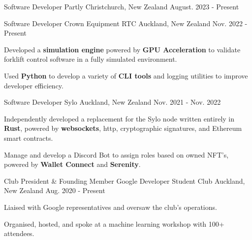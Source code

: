 
\begin{cventries}
  \cventry
    {Software Developer}
    {Partly}
    {Christchurch, New Zealand}
    {August. 2023 - Present}
    {
    }

  \cventry
    {Software Developer}
    {Crown Equipment RTC}
    {Auckland, New Zealand}
    {Nov. 2022 - Present}
    {
      \begin{cvitems}
        \item {Developed a \textbf{simulation engine} powered by \textbf{GPU Acceleration} to validate forklift control software in a fully simulated environment.}
        \item {Used \textbf{Python} to develop a variety of \textbf{CLI tools} and logging utilities to improve developer efficiency.}
      \end{cvitems}
    }

  \cventry
    {Software Developer} %
    {Sylo} %
    {Auckland, New Zealand} %
    {Nov. 2021 - Nov. 2022} %
    {
      \begin{cvitems} %
        \item {Independently developed a replacement for the Sylo node written entirely in \textbf{Rust}, powered by \textbf{websockets}, http, cryptographic signatures, and Ethereum smart contracts.}
        \item {Manage and develop a Discord Bot to assign roles based on owned NFT's, powered by \textbf{Wallet Connect} and \textbf{Serenity}.}
      \end{cvitems}
    }

  \cventry
    {Club President \& Founding Member} %
    {Google Developer Student Club} %
    {Auckland, New Zealand} %
    {Aug. 2020 - Present} %
    {
      \begin{cvitems} %
        \item {Liaised with Google representatives and oversaw the club's operations.}
        \item {Organised, hosted, and spoke at a machine learning workshop with 100+ attendees.}
      \end{cvitems}
    }


\end{cventries}

